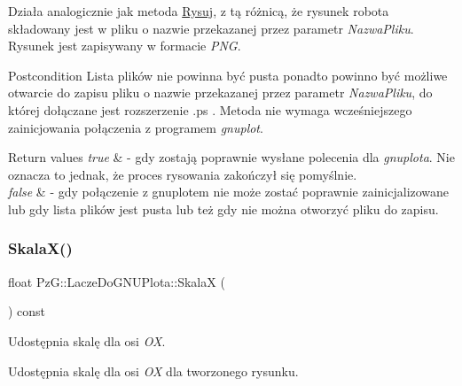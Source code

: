 Działa analogicznie jak metoda \hyperlink{classPzG_1_1LaczeDoGNUPlota_a065f5b8402737cc62b0ad4f66d028335}{Rysuj}, z tą różnicą, że rysunek robota składowany jest w pliku o nazwie przekazanej przez parametr {\itshape Nazwa\+Pliku}. Rysunek jest zapisywany w formacie {\itshape P\+NG}.

\begin{DoxyPostcond}{Postcondition}
Lista plików nie powinna być pusta ponadto powinno być możliwe otwarcie do zapisu pliku o nazwie przekazanej przez parametr {\itshape Nazwa\+Pliku}, do której dołączane jest rozszerzenie .ps . Metoda nie wymaga wcześniejszego zainicjowania połączenia z programem {\itshape gnuplot}.
\end{DoxyPostcond}

\begin{DoxyRetVals}{Return values}
{\em true} & -\/ gdy zostają poprawnie wysłane polecenia dla {\itshape gnuplota}. Nie oznacza to jednak, że proces rysowania zakończył się pomyślnie. \\
\hline
{\em false} & -\/ gdy połączenie z gnuplotem nie może zostać poprawnie zainicjalizowane lub gdy lista plików jest pusta lub też gdy nie można otworzyć pliku do zapisu. \\
\hline
\end{DoxyRetVals}
\mbox{\label{classPzG_1_1LaczeDoGNUPlota_a4b1eb252fd785a5aeff938e7b2dce2b1}} 
\subsubsection{\texorpdfstring{Skala\+X()}{SkalaX()}}
{\footnotesize\ttfamily float Pz\+G\+::\+Lacze\+Do\+G\+N\+U\+Plota\+::\+SkalaX (\begin{DoxyParamCaption}{ }\end{DoxyParamCaption}) const\hspace{0.3cm}{\ttfamily [inline]}}



Udostępnia skalę dla osi {\itshape OX}. 

Udostępnia skalę dla osi {\itshape OX} dla tworzonego rysunku. \mbox{\label{classPzG_1_1LaczeDoGNUPlota_a44f922ccbc508d6cd7809c669238dae3}} 
